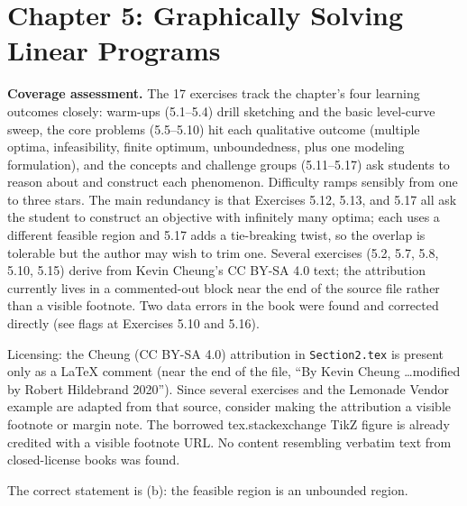 \section{Chapter 5: Graphically Solving Linear Programs}

\textbf{Coverage assessment.} The 17 exercises track the chapter's four learning outcomes closely: warm-ups (5.1--5.4) drill sketching and the basic level-curve sweep, the core problems (5.5--5.10) hit each qualitative outcome (multiple optima, infeasibility, finite optimum, unboundedness, plus one modeling formulation), and the concepts and challenge groups (5.11--5.17) ask students to reason about and construct each phenomenon. Difficulty ramps sensibly from one to three stars. The main redundancy is that Exercises 5.12, 5.13, and 5.17 all ask the student to construct an objective with infinitely many optima; each uses a different feasible region and 5.17 adds a tie-breaking twist, so the overlap is tolerable but the author may wish to trim one. Several exercises (5.2, 5.7, 5.8, 5.10, 5.15) derive from Kevin Cheung's CC BY-SA 4.0 text; the attribution currently lives in a commented-out block near the end of the source file rather than a visible footnote. Two data errors in the book were found and corrected directly (see flags at Exercises 5.10 and 5.16).

\begin{qaflag}
Licensing: the Cheung (CC BY-SA 4.0) attribution in \texttt{Section2.tex} is present only as a LaTeX comment (near the end of the file, ``By Kevin Cheung \dots modified by Robert Hildebrand 2020''). Since several exercises and the Lemonade Vendor example are adapted from that source, consider making the attribution a visible footnote or margin note. The borrowed tex.stackexchange TikZ figure is already credited with a visible footnote URL. No content resembling verbatim text from closed-license books was found.
\end{qaflag}

The correct statement is (b): the feasible region is an unbounded region.

